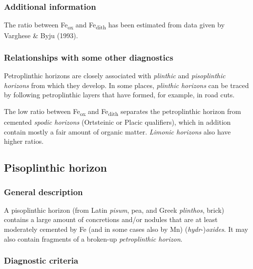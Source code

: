 \documentclass[
  letterpaper,
  DIV=11,
  numbers=noendperiod]{scrreprt}
\begin{document}
\hypertarget{additional-information-14}{%
\subsubsection{Additional information}\label{additional-information-14}}

The ratio between Fe\textsubscript{ox} and Fe\textsubscript{dith} has
been estimated from data given by Varghese \& Byju (1993).

\hypertarget{relationships-with-some-other-diagnostics-26}{%
\subsubsection{Relationships with some other
diagnostics}\label{relationships-with-some-other-diagnostics-26}}

Petroplinthic horizons are closely associated with \emph{plinthic} and
\emph{pisoplinthic horizons} from which they develop. In some places,
\emph{plinthic horizons} can be traced by following petroplinthic layers
that have formed, for example, in road cuts.

The low ratio between Fe\textsubscript{ox} and Fe\textsubscript{dith}
separates the petroplinthic horizon from cemented \emph{spodic horizons}
(Ortsteinic or Placic qualifiers), which in addition contain mostly a
fair amount of organic matter. \emph{Limonic horizons} also have higher
ratios.

\hypertarget{pisoplinthic-horizon}{%
\subsection{Pisoplinthic horizon}\label{pisoplinthic-horizon}}

\hypertarget{general-description-27}{%
\subsubsection{General description}\label{general-description-27}}

A pisoplinthic horizon (from Latin \emph{pisum}, pea, and Greek
\emph{plinthos}, brick) contains a large amount of concretions and/or
nodules that are at least moderately cemented by Fe (and in some cases
also by Mn) (\emph{hydr}-)\emph{oxides}. It may also contain fragments
of a broken-up \emph{petroplinthic horizon}.

\hypertarget{diagnostic-criteria-27}{%
\subsubsection{Diagnostic criteria}\label{diagnostic-criteria-27}}
\end{document}

